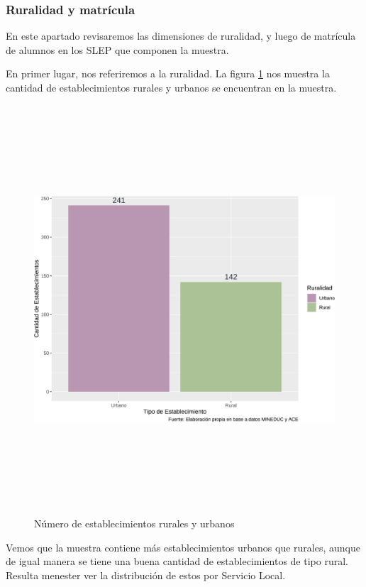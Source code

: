 \documentclass[
  12pt,
  letterpaper,
]{article}
\begin{document}
\subsubsection{Ruralidad y matrícula}\label{ruralidad-y-matruxedcula}

En este apartado revisaremos las dimensiones de ruralidad, y luego de matrícula de alumnos en los SLEP que componen la muestra.

En primer lugar, nos referiremos a la ruralidad.
La figura \ref{fig:grafico-ruralidad} nos muestra la cantidad de establecimientos rurales y urbanos se encuentran en la muestra.

\begin{figure}

{\centering \includegraphics[width=0.8\linewidth,height=6in]{tesis_ver_final_files/figure-latex/grafico-ruralidad-1} 

}

\caption{Número de establecimientos rurales y urbanos}\label{fig:grafico-ruralidad}
\end{figure}

Vemos que la muestra contiene más establecimientos urbanos que rurales, aunque de igual manera se tiene una buena cantidad de establecimientos de tipo rural.
Resulta menester ver la distribución de estos por Servicio Local.
\end{document}
